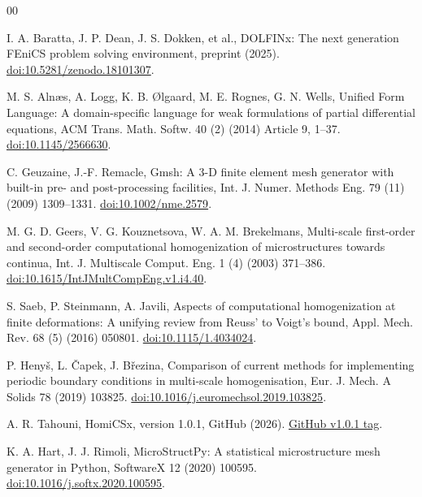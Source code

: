 \documentclass[preprint,12pt]{elsarticle}
\begin{document}
\fontsize{9}{10}\selectfont
\begin{thebibliography}{00}
\setlength{\itemsep}{0pt}
\setlength{\parsep}{0pt}

I. A. Baratta, J. P. Dean, J. S. Dokken, et al., DOLFINx: The next generation
FEniCS problem solving environment, preprint (2025).
\href{https://doi.org/10.5281/zenodo.18101307}{doi:10.5281/zenodo.18101307}.

M. S. Aln\ae s, A. Logg, K. B. \O lgaard, M. E. Rognes, G. N. Wells, Unified
Form Language: A domain-specific language for weak formulations of partial
differential equations, ACM Trans. Math. Softw. 40 (2) (2014) Article 9,
1--37.
\href{https://doi.org/10.1145/2566630}{doi:10.1145/2566630}.

C. Geuzaine, J.-F. Remacle, Gmsh: A 3-D finite element mesh generator with
built-in pre- and post-processing facilities, Int. J. Numer. Methods Eng. 79
(11) (2009) 1309--1331. \href{https://doi.org/10.1002/nme.2579}{doi:10.1002/nme.2579}.

M. G. D. Geers, V. G. Kouznetsova, W. A. M. Brekelmans, Multi-scale
first-order and second-order computational homogenization of microstructures
towards continua, Int. J. Multiscale Comput. Eng. 1 (4) (2003) 371--386.
\href{https://doi.org/10.1615/IntJMultCompEng.v1.i4.40}{doi:10.1615/IntJMultCompEng.v1.i4.40}.

S. Saeb, P. Steinmann, A. Javili, Aspects of computational homogenization at
finite deformations: A unifying review from Reuss' to Voigt's bound, Appl.
Mech. Rev. 68 (5) (2016) 050801.
\href{https://doi.org/10.1115/1.4034024}{doi:10.1115/1.4034024}.

P. Heny\v{s}, L. \v{C}apek, J. B\v{r}ezina, Comparison of current methods for
implementing periodic boundary conditions in multi-scale homogenisation, Eur.
J. Mech. A Solids 78 (2019) 103825.
\href{https://doi.org/10.1016/j.euromechsol.2019.103825}{doi:10.1016/j.euromechsol.2019.103825}.

A. R. Tahouni, HomiCSx, version 1.0.1, GitHub (2026).
\href{https://github.com/AmirTahouni/HomiCSx/tree/v1.0.1}{GitHub v1.0.1 tag}.

K. A. Hart, J. J. Rimoli, MicroStructPy: A statistical microstructure mesh
generator in Python, SoftwareX 12 (2020) 100595.
\href{https://doi.org/10.1016/j.softx.2020.100595}{doi:10.1016/j.softx.2020.100595}.


\end{thebibliography}
\end{document}
